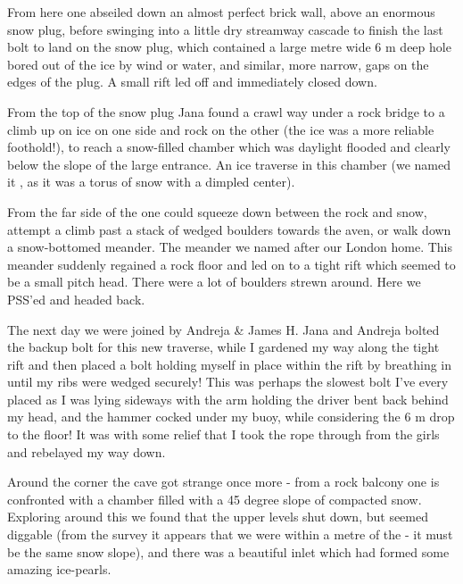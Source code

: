 From here one
abseiled down an almost perfect brick wall, above an enormous snow plug,
before swinging into a little dry streamway cascade to finish the last
bolt to land on the snow plug, which contained a large metre wide 6 m
deep hole bored out of the ice by wind or water, and similar, more
narrow, gaps on the edges of the plug. A small rift led off and
immediately closed down. 

From the top of the snow plug Jana found a
crawl way under a rock bridge to a climb up on ice on one side and rock
on the other (the ice was a more reliable foothold!), to reach a
snow-filled chamber which was daylight flooded and clearly below the
slope of the large entrance. An ice traverse in this chamber (we named
it , as it was a torus of snow with a dimpled center).

From the far side of the  one could squeeze down
between the rock and snow, attempt a climb past a stack of wedged
boulders towards the aven, or walk down a snow-bottomed meander. The
meander we named  after our London home. This meander
suddenly regained a rock floor and led on to a tight rift which seemed
to be a small pitch head. There were a lot of boulders strewn around.
Here we PSS'ed and headed back.

The next day we were joined by Andreja \& James H. Jana and Andreja
bolted the backup bolt for this new traverse, while I gardened my way
along the tight rift and then placed a bolt holding myself in place
within the rift by breathing in until my ribs were wedged securely! This
was perhaps the slowest bolt I've every placed as I was lying sideways
with the arm holding the driver bent back behind my head, and the hammer
cocked under my buoy, while considering the 6 m drop to the floor! It
was with some relief that I took the rope through from the girls and
rebelayed my way down.


Around the corner the cave got strange once more - from a rock balcony
one is confronted with a chamber filled with a 45 degree slope of
compacted snow. Exploring around this we found that the upper levels
shut down, but seemed diggable (from the survey it appears that we were
within a metre of the  - it must be the same snow slope), and there was a beautiful inlet which had formed some amazing
ice-pearls. 

